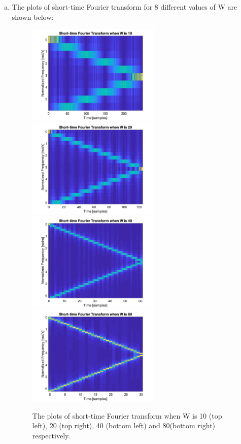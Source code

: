 \documentclass[a4paper]{article}
\begin{document}
\begin{spacing}{2.0}
\begin{enumerate}[(a)]
\item The plots of short-time Fourier transform for 8 different values of W are shown below:
\begin{figure}[H]
\centering
\includegraphics[width=2.5in]{Q3W10.jpg}
\includegraphics[width=2.5in]{Q3W20.jpg}
\includegraphics[width=2.5in]{Q3W40.jpg}
\includegraphics[width=2.5in]{Q3W80.jpg}
\caption{The plots of short-time Fourier transform when W is 10 (top left), 20 (top right), 40 (bottom left) and 80(bottom right) respectively.}
\end{figure}


\end{enumerate}
\end{spacing}
\end{document}
